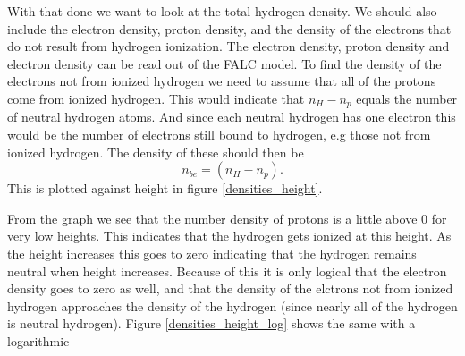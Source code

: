 \documentclass{aa}   %
\begin{document}


With that done we want to look at the total hydrogen density. We should also include the electron density, proton density, and the density of the electrons that do not result from hydrogen ionization. The electron density, proton density and electron density can be read out of the FALC model. To find the density of the electrons not from ionized hydrogen we need to assume that all of the protons come from ionized hydrogen. This would indicate that $n_H - n_p$ equals the number of neutral hydrogen atoms. And since each neutral hydrogen has one electron this would be the number of electrons still bound to hydrogen, e.g those not from ionized hydrogen. The density of these should then be
\begin{equation}
 n_{be} = (n_H - n_p).
\end{equation}
This is plotted against height in figure \ref{densities_height}. 

From the graph we see that the number density of protons is a little above 0 for very low heights. This indicates that the hydrogen gets ionized at this height. As the height increases this goes to zero indicating that the hydrogen remains neutral when height increases. Because of this it is only logical that the electron density goes to zero as well, and that the density of the elctrons not from ionized hydrogen approaches the density of the hydrogen (since nearly all of the hydrogen is neutral hydrogen). Figure \ref{densities_height_log} shows the same with a logarithmic
\end{document}

